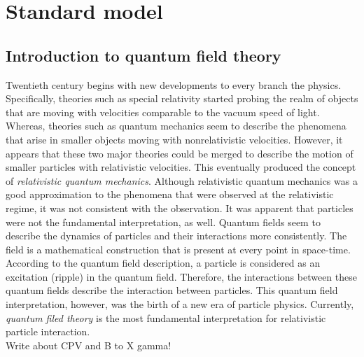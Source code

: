 
\chapter{Standard model}\label{chap:one}

\section{Introduction to quantum field theory}\label{intro}
Twentieth century begins with new developments to every branch the physics. Specifically, theories such as special relativity started probing the realm of objects that are moving with velocities comparable to the vacuum speed of light. Whereas, theories such as quantum mechanics seem to describe the phenomena that arise in smaller objects moving with nonrelativistic velocities. However, it appears that these two major theories could be merged to describe the motion of smaller particles with relativistic velocities. This eventually produced the concept of \textit{relativistic quantum mechanics}. Although relativistic quantum mechanics was a good approximation to the phenomena that were observed at the relativistic regime, it was not consistent with the observation. It was apparent that particles were not the fundamental interpretation, as well. Quantum fields seem to describe the dynamics of particles and their interactions more consistently. The field is a mathematical construction that is present at every point in space-time. According to the quantum field description, a particle is considered as an excitation (ripple) in the quantum field.  Therefore, the interactions between these quantum fields describe the interaction between particles. This quantum field interpretation, however, was the birth of a new era of particle physics. Currently, \textit{quantum filed theory} is the most fundamental interpretation for relativistic particle interaction.\\
Write about CPV and B to X gamma!
